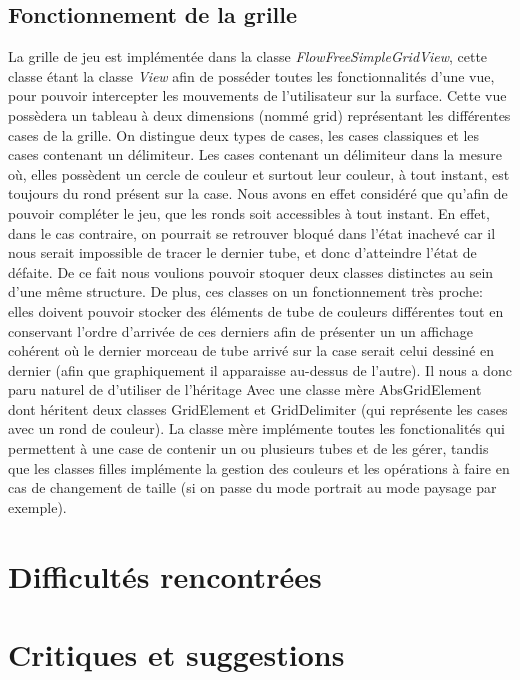 \documentclass[12pt, a4paper]{article}
\begin{document}
    \subsection{Fonctionnement de la grille}
    La grille de jeu est implémentée dans la classe \textit{FlowFreeSimpleGridView}, cette classe étant la classe \textit{View}
afin de posséder toutes les fonctionnalités d'une vue, pour pouvoir intercepter les mouvements de l'utilisateur sur la surface.
Cette vue possèdera un tableau à deux dimensions (nommé grid) représentant les différentes cases de la grille. On distingue deux
types de cases, les cases classiques et les cases contenant un délimiteur. Les cases contenant un délimiteur dans la mesure où,
elles possèdent un cercle de couleur et surtout leur couleur, à tout instant, est toujours du rond présent sur la case. Nous avons
en effet considéré que qu'afin de pouvoir compléter le jeu, que les ronds soit accessibles à tout instant. En effet, dans le cas
contraire, on pourrait se retrouver bloqué dans l'état inachevé car il nous serait impossible de tracer le dernier tube, et donc
d'atteindre l'état de défaite. De ce fait nous voulions pouvoir stoquer deux classes distinctes au sein d'une même structure. De
plus, ces classes on un fonctionnement très proche: elles doivent pouvoir stocker des éléments de tube de couleurs différentes
tout en conservant l'ordre d'arrivée de ces derniers afin de présenter un un affichage cohérent où le dernier morceau de tube
arrivé sur la case serait celui dessiné en dernier (afin que graphiquement il apparaisse au-dessus de l'autre). Il nous a donc
paru naturel de d'utiliser de l'héritage Avec une classe mère AbsGridElement dont héritent deux classes GridElement et
GridDelimiter (qui représente les cases avec un rond de couleur). La classe mère implémente toutes les fonctionalités qui
permettent à une case de contenir un ou plusieurs tubes et de les gérer, tandis que les classes filles implémente la gestion des
couleurs et les opérations à faire en cas de changement de taille (si on passe du mode portrait au mode paysage par exemple).
\section{Difficultés rencontrées}
\section{Critiques et suggestions}
\end{document}
